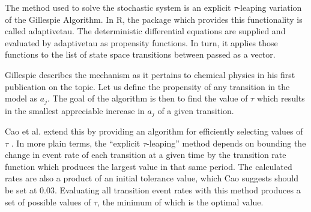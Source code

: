 \documentclass[../Paper.tex]{subfiles}
\begin{document}
The method used to solve the stochastic system is an explicit $\tau $-leaping variation of the Gillespie Algorithm. In R, the package which provides this functionality is called adaptivetau. The deterministic differential equations are supplied and evaluated by adaptivetau as propensity functions.  In turn, it applies those functions to the list of state space transitions between passed as a vector.

Gillespie describes the mechanism as it pertains to chemical physics in his first publication on the topic\cite{gillespie_2001}. Let us define the propensity of any transition in the model as $a_{j}$. The goal of the algorithm is then to find the value of $\tau$ which results in the smallest appreciable increase in $a_{j}$ of a given transition.

Cao et al. extend this by providing an algorithm for efficiently selecting values of $\tau$ \cite{cao_gillespie_petzold_2007}. In more plain terms, the ``explicit $\tau$-leaping'' method depends on bounding the change in event rate of each transition at a given time by the transition rate function which produces the largest value in that same period. The calculated rates are also a product of an initial tolerance value, which Cao suggests should be set at 0.03. Evaluating all transition event rates with this method produces a set of possible values of $\tau$, the minimum of which is the optimal value.
\end{document}

